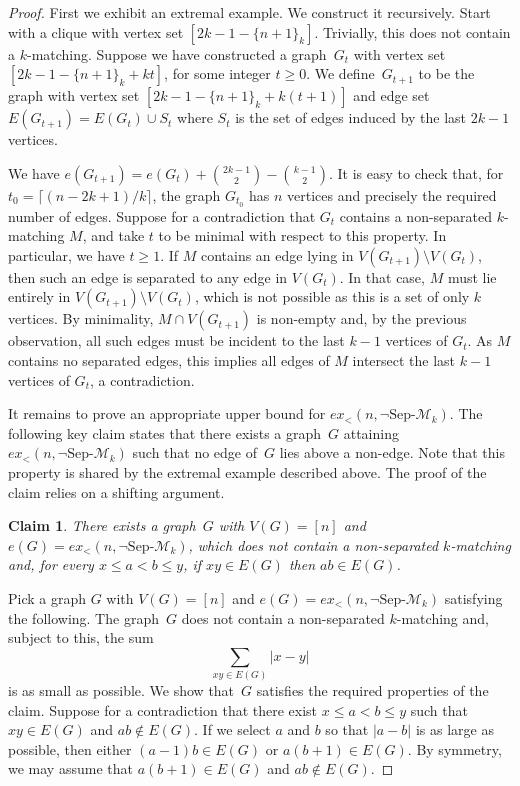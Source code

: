 \documentclass[11pt]{article}
\newtheorem{claim}[theorem]{Claim}
\theoremstyle{definition}
\newenvironment{proofclaim}{\removelastskip\penalty55\medskip\noindent{\it Proof of the claim. }}{\medskip}
\def\marrow{{\marginpar[\hfill$\longrightarrow$]{$\longleftarrow$}}}
\def\janos#1{{\sc J\'anos says: }{\marrow\sf #1}}
\begin{document}
\begin{proof}
    First we exhibit an extremal example.
    We construct it recursively.
    Start with a clique with vertex set $[2k-1-\{n+1\}_k]$.
    Trivially, this does not contain a $k$-matching.
    Suppose we have constructed a graph~$G_t$ with vertex set $[2k-1-\{n+1\}_k+kt]$, for some integer $t\ge0$.
    We define~$G_{t+1}$ to be the graph with vertex set $[2k-1-\{n+1\}_k+k(t+1)]$ and edge set $E(G_{t+1})=E(G_t)\cup S_t$ where
    $S_t$ is the set of edges induced by the last $2k-1$ vertices.
    
    We have
    $e(G_{t+1})=e(G_t)+\binom{2k-1}{2}-\binom{k-1}{2}$.
    It is easy to check that, for $t_0=\lceil(n-2k+1)/k\rceil$, the graph $G_{t_0}$ has $n$ vertices and precisely the required number of edges.
    Suppose for a contradiction that $G_t$ contains a non-separated $k$-matching $M$, and take $t$ to be minimal with respect to this property.
    In particular, we have $t\ge1$.
    If $M$ contains an edge lying in $V(G_{t+1})\setminus V(G_t)$, then such an edge is separated to any edge in $V(G_t)$. In that case, $M$ must lie entirely in $V(G_{t+1})\setminus V(G_t)$, which is not possible as this is a set of only $k$ vertices.
    By minimality, $M\cap V(G_{t+1})$ is non-empty and, by the previous observation, all such edges must be incident to the last $k-1$ vertices of $G_t$. 
    As $M$ contains no separated edges, this implies all edges of $M$ intersect the last $k-1$ vertices of $G_t$, a contradiction.


It remains to prove an appropriate upper bound for $ex_<(n,\neg\text{Sep-}\mathcal M_k)$.
The following key claim states that there exists a graph~$G$ attaining $ex_<(n,\neg\text{Sep-}\mathcal M_k)$ such that no edge of~$G$ lies above a non-edge.
Note that this property is shared by the extremal example described above.
The proof of the claim relies on a shifting argument.
    \begin{claim}\label{claim:key}
        There exists a graph~$G$ with $V(G)=[n]$ and $e(G)=ex_<(n,\neg\text{Sep-}\mathcal M_k)$, which does not contain a non-separated $k$-matching and, for every $x\le a<b\le y$, if $xy\in E(G)$ then $ab\in E(G)$.
    \end{claim}
    \begin{proofclaim}
        Pick a graph $G$ with $V(G)=[n]$ and $e(G)=ex_<(n,\neg\text{Sep-}\mathcal M_k)$ satisfying the following.
        The graph~$G$ does not contain a non-separated $k$-matching and, subject to this, the sum
        $$\sum_{xy\in E(G)}|x-y|$$
        is as small as possible.
        We show that~$G$ satisfies the required properties of the claim.
        Suppose for a contradiction that there exist $x\le a<b\le y$ such that $xy\in E(G)$ and $ab\notin E(G)$.
        If we select $a$ and $b$  so that $|a-b|$ is as large as possible, then either $(a{-}1)b\in E(G)$ or $a(b{+}1)\in E(G)$.
        By symmetry, we may assume that $a(b{+}1)\in E(G)$ and $ab\notin E(G)$.


\end{proofclaim}
\end{proof}
\end{document}
